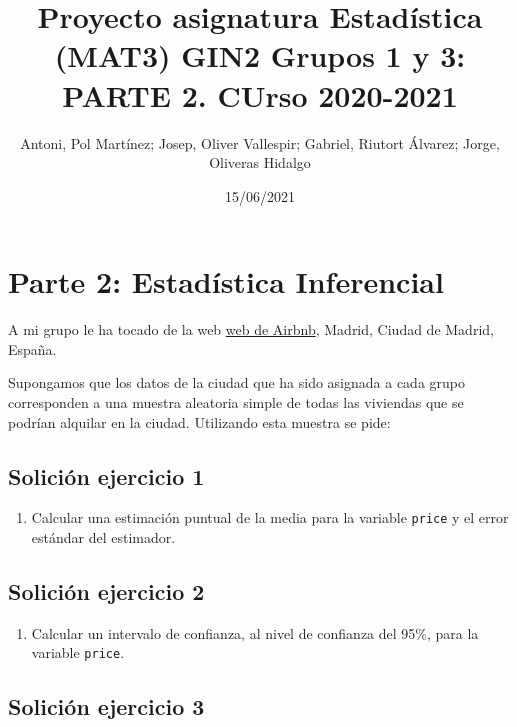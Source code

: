 \documentclass[
]{article}
\title{Proyecto asignatura Estadística (MAT3) GIN2 Grupos 1 y 3: PARTE
2. CUrso 2020-2021}
\author{Antoni, Pol Martínez; Josep, Oliver Vallespir; Gabriel, Riutort
Álvarez; Jorge, Oliveras Hidalgo}
\date{15/06/2021}
\providecommand{\tightlist}{%
  \setlength{\itemsep}{0pt}\setlength{\parskip}{0pt}}
\begin{document}
\maketitle

{
\hypersetup{linkcolor=blue}
\setcounter{tocdepth}{2}
\tableofcontents
}
\hypertarget{parte-2-estaduxedstica-inferencial}{%
\section{Parte 2: Estadística
Inferencial}\label{parte-2-estaduxedstica-inferencial}}

A mi grupo le ha tocado de la web
\href{http://insideairbnb.com/get-the-data.html}{web de Airbnb}, Madrid,
Ciudad de Madrid, España.

Supongamos que los datos de la ciudad que ha sido asignada a cada grupo
corresponden a una muestra aleatoria simple de todas las viviendas que
se podrían alquilar en la ciudad. Utilizando esta muestra se pide:

\hypertarget{soliciuxf3n-ejercicio-1}{%
\subsection{Solición ejercicio 1}\label{soliciuxf3n-ejercicio-1}}

\begin{enumerate}
\def\labelenumi{\arabic{enumi}.}
\tightlist
\item
  Calcular una estimación puntual de la media para la variable
  \texttt{price} y el error estándar del estimador.
\end{enumerate}

\hypertarget{soliciuxf3n-ejercicio-2}{%
\subsection{Solición ejercicio 2}\label{soliciuxf3n-ejercicio-2}}

\begin{enumerate}
\def\labelenumi{\arabic{enumi}.}
\setcounter{enumi}{1}
\tightlist
\item
  Calcular un intervalo de confianza, al nivel de confianza del 95\%,
  para la variable \texttt{price}.
\end{enumerate}

\hypertarget{soliciuxf3n-ejercicio-3}{%
\subsection{Solición ejercicio 3}\label{soliciuxf3n-ejercicio-3}}
\end{document}
